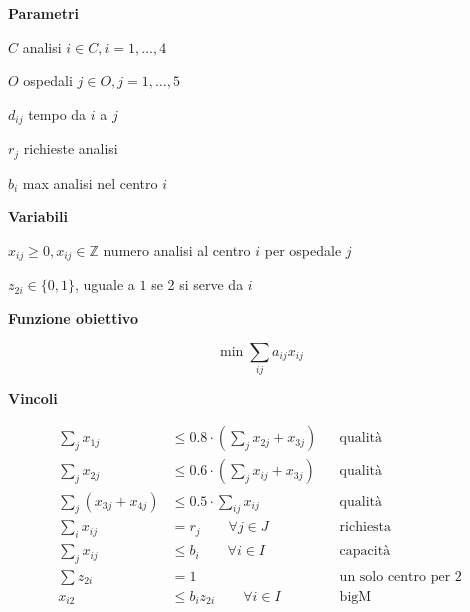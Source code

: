 \documentclass[10pt,a4paper,twoside,openright]{book}
\newcounter{es}
\newcommand{\Par}{\textbf{Parametri}}
\newcommand{\Var}{\textbf{Variabili}}
\newcommand{\Fob}{\textbf{Funzione obiettivo}}
\newcommand{\Vin}{\textbf{Vincoli}}
\begin{document}
\Par

$C$ analisi $i\in C,i=1,\dotsc ,4$

$O$ ospedali $j\in O,j=1,\dotsc ,5$

$d_{ij}$ tempo da $i$ a $j$

$r_{j}$ richieste analisi

$b_{i}$ max analisi nel centro $i$

\Var

$x_{ij} \geq 0,x_{ij} \in \mathbb{Z}$ numero analisi al centro $i$ per ospedale $j$

$z_{2i} \in \{0,1\}$, uguale a $1$ se 2 si serve da $i$

\Fob

\begin{equation*}
	\min\sum _{ij} a_{ij} x_{ij}
\end{equation*}

\Vin

\begin{align*}
	\sum _{j} x_{1j} &\leq 0.8\cdot \left(\sum _{j} x_{2j} +x_{3j}\right) && \text{qualità} \\
	\sum _{j} x_{2j} &\leq 0.6\cdot \left(\sum _{j} x_{ij} +x_{3j}\right) && \text{qualità} \\
	\sum _{j}( x_{3j} +x_{4j}) &\leq 0.5\cdot \sum _{ij} x_{ij} && \text{qualità} \\
	\sum _{i} x_{ij} &=r_{j} \qquad\forall j\in J && \text{richiesta} \\
	\sum _{j} x_{ij} &\leq b_{i} \qquad\forall i\in I && \text{capacità} \\
	\sum z_{2i} &=1 && \text{un solo centro per 2} \\
	x_{i2} &\leq b_{i} z_{2i} \qquad\forall i\in I && \text{bigM} \\
\end{align*}
\end{document}
